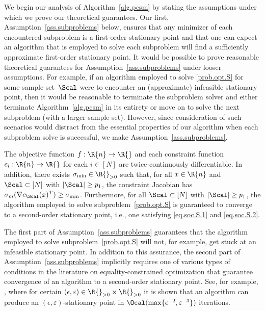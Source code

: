 We begin our analysis of Algorithm~\ref{alg.pcsm} by stating the assumptions under which we prove our theoretical guarantees.  Our first, Assumption~\ref{ass.subproblems} below, ensures that any minimizer of each encountered subproblem is a first-order stationary point and that one can expect an algorithm that is employed to solve each subproblem will find a sufficiently approximate first-order stationary point.  It would be possible to prove reasonable theoretical guarantees for Assumption~\ref{ass.subproblems} under looser assumptions.  For example, if an algorithm employed to solve \eqref{prob.opt.S} for some sample set~$\Scal$ were to encounter an (approximate) infeasible stationary point, then it would be reasonable to terminate the subproblem solver and either terminate Algorithm~\ref{alg.pcsm} in its entirety or move on to solve the next subproblem (with a larger sample set).  However, since consideration of such scenarios would distract from the essential properties of our algorithm when each subproblem solve is successful, we make Assumption~\ref{ass.subproblems}.

\bassumption\label{ass.subproblems}
  The objective function $f : \R{n} \to \R{}$ and each constraint function $c_i : \R{n} \to \R{}$ for each $i \in [N]$ are twice-continuously differentiable.  In addition, there exists $\sigma_{\min} \in \R{}_{>0}$ such that, for all $x \in \R{n}$ and $\Scal \subset [N]$ with $|\Scal| \geq p_1$, the constraint Jacobian has $\sigma_m(\nabla c_\Scal(x)^T) \geq \sigma_{\min}$.  Furthermore, for all $\Scal \subset [N]$ with $|\Scal| \geq p_1$, the algorithm employed to solve subproblem~\eqref{prob.opt.S} is guaranteed to converge to a second-order stationary point, i.e., one satisfying \eqref{eq.soc.S.1} and \eqref{eq.soc.S.2}.
\eassumption

The first part of Assumption~\ref{ass.subproblems} guarantees that the algorithm employed to solve subproblem~\eqref{prob.opt.S} will not, for example, get stuck at an infeasible stationary point.  In addition to this assurance, the second part of Assumption~\ref{ass.subproblems} implicitly requires one of various types of conditions in the literature on equality-constrained optimization that guarantee convergence of an algorithm to a second-order stationary point. See, for example, \cite{GoyeEfteBoum2024}, where for certain $(\epsilon,\varepsilon) \in \R{}_{>0} \times \R{}_{>0}$ it is shown that an algorithm can produce an $(\epsilon,\varepsilon)$-stationary point in $\Ocal(\max\{\epsilon^{-2}, \varepsilon^{-3}\})$ iterations.

